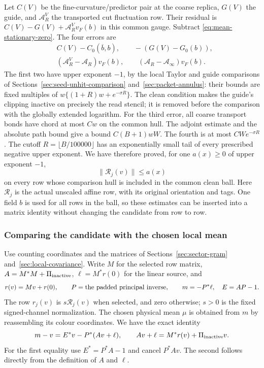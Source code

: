 Let $C(V)$ be the fine-curvature/predictor pair at the coarse replica,
$G(V)$ the guide, and $\mathcal A_R^V$ the transported cut fluctuation
row. Their residual is
$C(V)-G(V)+\mathcal A_R^Vv_F(b)$ in this common gauge.
Subtract \eqref{eq:mean-stationary-zero}. The four errors are
\[
 \begin{split}
 &C(V)-C_0(\overline b,b),\qquad -(G(V)-G_0(b)),\\
 &(\mathcal A_R^V-\mathcal A_R)v_F(b),\qquad
 (\mathcal A_R-\mathcal A_\infty)v_F(b).
 \end{split}
\]
The first two have upper exponent $-1$, by the local Taylor and
guide comparisons of Sections~\ref{sec:seed-unhit-comparison}
and~\ref{sec:packet-annulus}: their bounds are fixed multiples of
$w\{(1+R)w+e^{-\sigma R}\}$. The clean condition makes the guide's
clipping inactive on precisely the read stencil; it is removed
before the comparison with the globally extended logarithm.
For the third error, all coarse transport bonds have chord at most
$Cw$ on the common hull. The adjoint estimate and the absolute path
bound give a bound $C(B+1)wW$. The fourth is at most
$CW e^{-\sigma R}$. The cutoff $R=\lfloor B/100000\rfloor$ has
an exponentially small tail of every prescribed negative upper
exponent. We have therefore proved, for one $a(x)\ge0$ of upper
exponent $-1$,
\begin{equation}\label{eq:mean-candidate-residual}
 \|\mathcal R_j(v)\|\le a(x)
\end{equation}
on every row whose comparison hull is included in the common clean
ball. Here $\mathcal R_j$ is the actual unscaled affine row, with
its original orientation and tags. One field $b$ is used for all
rows in the ball, so these estimates can be inserted into a matrix
identity without changing the candidate from row to row.

\subsubsection{Comparing the candidate with the chosen local mean}
Use counting coordinates and the matrices of
Sections~\ref{sec:sector-gram} and~\ref{sec:local-covariance}.
Write $M$ for the selected row matrix, $A=M^*M+\Pi_{\rm inactive}$,
$\ell=M^*r(0)$ for the linear source, and
\[
 r(v)=Mv+r(0),\qquad P=\hbox{the padded principal inverse},
 \qquad m=-P^*\ell,\quad E=AP-1.
\]
The row $r_j(v)$ is $s\mathcal R_j(v)$ when selected, and zero
otherwise; $s>0$ is the fixed signed-channel normalization. The
chosen physical mean $\mu$ is obtained from $m$ by reassembling its
colour coordinates. We have the exact identity
\begin{equation}\label{eq:mean-error-identity}
 m-v=E^*v-P^*(Av+\ell),\qquad
 Av+\ell=M^*r(v)+\Pi_{\rm inactive}v.
\end{equation}
For the first equality use $E^*=P^*A-1$ and cancel $P^*Av$.
The second follows directly from the definition of $A$ and $\ell$.

